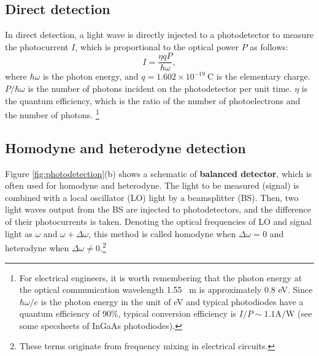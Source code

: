 \subsection{Direct detection}
In direct detection, a light wave is directly injected to a photodetector to measure the photocurrent $I$, which is proportional to the optical power $P$ as follows:
\begin{equation}
	I = \frac{\eta q P}{\hbar \omega},
	\nonumber
\end{equation}
where $\hbar \omega$ is the photon energy, and $q = 1.602 \times 10^{-19} \ \mathrm{C}$ is the elementary charge. $P / \hbar \omega$ is the number of photons incident on the photodetector per unit time. $\eta$ is the quantum efficiency, which is the ratio of the number of photoelectrons and the number of photons.
\footnote{For electrical engineers, it is worth remembering that the photon energy at the optical communication wavelength 1.55 \ \textmu m is approximately 0.8 eV. Since $\hbar \omega / e$ is the photon energy in the unit of eV and typical photodiodes have a quantum efficiency of 90\%, typical conversion efficiency is $I/P \sim 1.1 \mathrm{A/W}$ (see some specsheets of InGaAs photodiodes).}

\subsection{Homodyne and heterodyne detection}

Figure \ref{fig:photodetection}(b) shows a schematic of \textbf{balanced detector}, which is often used for homodyne and heterodyne. The light to be measured (signal) is combined with a local oscillator (LO) light by a beamsplitter (BS). Then, two light waves output from the BS are injected to photodetectors, and the difference of their photocurrents is taken. Denoting the optical frequencies of LO and signal light as $\omega$ and $\omega + \Delta \omega$, this method is called homodyne when $\Delta \omega = 0$ and heterodyne when $\Delta \omega \neq 0$.\footnote{These terms originate from frequency mixing in electrical circuits.}

